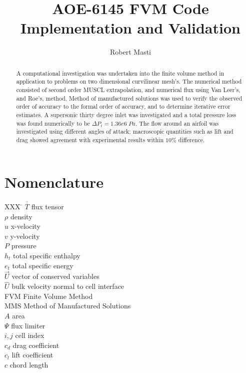 \documentclass[]{aiaa-tc}%
\title{AOE-6145 FVM Code Implementation and Validation}
\author{
  Robert Masti%
}
\newcommand*{\rttensor}[1]{\overline{\overline{#1}}}
\begin{document}
\maketitle

\begin{abstract}
A computational investigation was undertaken into the finite volume method in application to problems on two dimensional curvilinear mesh's. The numerical method consisted of second order MUSCL extrapolation, and numerical flux using Van Leer's, and Roe's, method. Method of manufactured solutions was used to verify the observed order of accuracy to the formal order of accuracy, and to determine iterative error estimates. A supersonic thirty degree inlet was investigated and a total pressure loss was found numerically to be $\Delta P_t=1.36e6\;Pa$. The flow around an airfoil was investigated using different angles of attack; macroscopic quantities such as lift and drag showed agreement with experimental results within $10\%$ difference.
\end{abstract}

\section*{Nomenclature}

\begin{tabbing}
XXX \= \kill%
 $\rttensor{T}$ \> flux tensor \\
 $\rho$ \> density \\
 $u$ \> x-velocity \\
 $v$ \> y-velocity \\
 $P$ \> pressure \\
 $h_t$ \> total specific enthalpy\\
 $e_t$ \> total specific energy\\
 $\vec{U}$ \> vector of conserved variables\\
 $\hat{U}$ \> bulk velocity normal to cell interface\\ 
  FVM \> Finite Volume Method \\
  MMS \> Method of Manufactured Solutions \\
  $A$ \> area \\
  $\Psi$ \> flux limiter \\
  $i,j$ \> cell index\\
  $c_d$ \> drag coefficient\\
  $c_l$ \> lift coefficient\\
  $c$ \> chord length
\end{tabbing}
\end{document}
